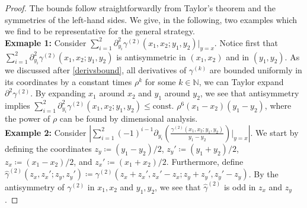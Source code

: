 \documentclass[a4paper,11pt]{article}
\newcommand{\abs}[1]{\left\lvert #1 \right\rvert}
\numberwithin{equation}{section}
\begin{document}
	\begin{proof}
	The bounds follow straightforwardly from Taylor's theorem and the symmetries of the left-hand sides.
	We give, in the following, two examples which we find to be representative for the general strategy.\\
	\textbf{Exmaple 1:} Consider $ \sum_{i=1}^{2}\partial_{y_i}^2\gamma^{(2)}(x_1,x_2;y_1,y_2)\rvert_{y=x} $. Notice first that $ \sum_{i=1}^{2}\partial_{y_i}^2\gamma^{(2)}(x_1,x_2;y_1,y_2) $ is antisymmetric in $ (x_1,x_2) $ and in $ (y_1,y_2) $. As we discussed after \eqref{derivsbound}, all derivatives of $ \gamma^{(k)} $ are bounded uniformly in its coordinates by a constant times $ \rho^k $ for some $ k\in\mathbb{N} $, we can Taylor expand $ \partial^2\gamma^{(2)} $. By expanding $ x_1 $ around $ x_2 $ and $ y_1 $ around $ y_2 $, we see that antisymmetry implies $ \sum_{i=1}^{2}\partial_{y_i}^2\gamma^{(2)}(x_1,x_2;y_1,y_2)\leq \text{const. }\rho^6(x_1-x_2)(y_1-y_2) $, where the power of $ \rho $ can be found by dimensional analysis.\\
	\textbf{Example 2:} Consider $\abs{\sum_{i=1}^{2}(-1)^{i-1}\partial_{y_i}\left(\frac{\gamma^{(2)}(x_1,x_2;y_1,y_2)}{y_1-y_2}\right)\Bigg\rvert_{y=x}}$. We start by defining the coordinates $z_y\coloneqq (y_1-y_2)/2$, $z_y'\coloneqq (y_1+y_2)/2$, $z_x\coloneqq (x_1-x_2)/2$, and $z_x'\coloneqq (x_1+x_2)/2$. Furthermore, define $\hat{\gamma}^{(2)}(z_x,z_x';z_y,z_y')\coloneqq\gamma^{(2)}(z_x+z_x',z_x'-z_x;z_y+z_y',z_y'-z_y)$. By the antisymmetry of $\gamma^{(2)}$ in $x_1,x_2$ and $y_1,y_2$, we see that $\hat{\gamma}^{(2)}$ is odd in $z_x$ and $z_y$.
	

\end{proof}
\end{document}
